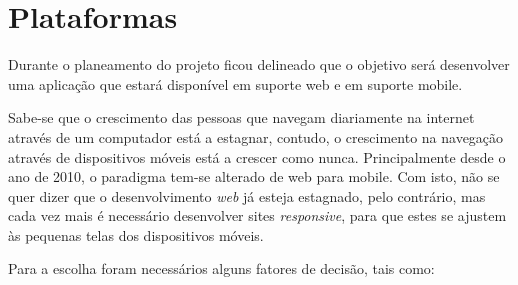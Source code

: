 \section{Plataformas}

Durante o planeamento do projeto ficou delineado que o objetivo será desenvolver uma aplicação que estará disponível em suporte web e em suporte mobile.

Sabe-se que o crescimento das pessoas que navegam diariamente na internet através de um computador está a estagnar, contudo, o crescimento na navegação através de dispositivos móveis está a crescer como nunca. Principalmente desde o ano de 2010, o paradigma tem-se alterado de web para mobile. Com isto, não se quer dizer que o desenvolvimento \textit{web} já esteja estagnado, pelo contrário, mas cada vez mais é necessário desenvolver sites \textit{responsive}, para que estes se ajustem às pequenas telas dos dispositivos móveis.

Para a escolha foram necessários alguns fatores de decisão, tais como:

